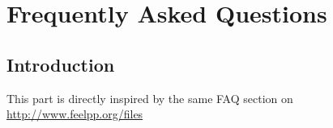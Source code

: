 \chapter{Frequently Asked Questions}
\label{sec:faq}

\section{Introduction}
\label{faq:intro}

This part is directly inspired by the same FAQ section on \href{\feel web site}{http://www.feelpp.org/files}